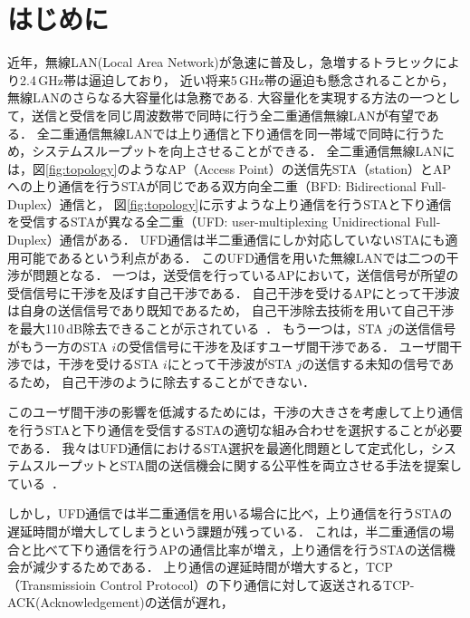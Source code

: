 \documentclass[technicalreport]{ieicej}
\begin{document}

\maketitle

\section{はじめに}
	近年，無線LAN(Local Area Network)が急速に普及し，急増するトラヒックにより2.4\,GHz帯は逼迫しており，
	近い将来5\,GHz帯の逼迫も懸念されることから，無線LANのさらなる大容量化は急務である.
	大容量化を実現する方法の一つとして，送信と受信を同じ周波数帯で同時に行う全二重通信無線LANが有望である．
	全二重通信無線LANでは上り通信と下り通信を同一帯域で同時に行うため，システムスループットを向上させることができる．
	全二重通信無線LANには，図\ref{fig:topology}のようなAP（Access Point）の送信先STA（station）とAPへの上り通信を行うSTAが同じである双方向全二重（BFD: Bidirectional Full-Duplex）通信と，
	図\ref{fig:topology}に示すような上り通信を行うSTAと下り通信を受信するSTAが異なる全二重（UFD: user-multiplexing Unidirectional Full-Duplex）通信がある．
	UFD通信は半二重通信にしか対応していないSTAにも適用可能であるという利点がある．
	このUFD通信を用いた無線LANでは二つの干渉が問題となる．
	一つは，送受信を行っているAPにおいて，送信信号が所望の受信信号に干渉を及ぼす自己干渉である．
	自己干渉を受けるAPにとって干渉波は自身の送信信号であり既知であるため，
	自己干渉除去技術を用いて自己干渉を最大110\,dB除去できることが示されている~\cite{fdmac, stanford1}．
	もう一つは，STA $j$の送信信号がもう一方のSTA $i$の受信信号に干渉を及ぼすユーザ間干渉である．
	ユーザ間干渉では，干渉を受けるSTA $i$にとって干渉波がSTA $j$の送信する未知の信号であるため，
	自己干渉のように除去することができない．
	\par
	このユーザ間干渉の影響を低減するためには，干渉の大きさを考慮して上り通信を行うSTAと下り通信を受信するSTAの適切な組み合わせを選択することが必要である．
	我々はUFD通信におけるSTA選択を最適化問題として定式化し，システムスループットとSTA間の送信機会に関する公平性を両立させる手法を提案している~\cite{promac_fair}．
	\par
	しかし，UFD通信では半二重通信を用いる場合に比べ，上り通信を行うSTAの遅延時間が増大してしまうという課題が残っている．
	これは，半二重通信の場合と比べて下り通信を行うAPの通信比率が増え，上り通信を行うSTAの送信機会が減少するためである．
	上り通信の遅延時間が増大すると，TCP（Transmissioin Control Protocol）の下り通信に対して返送されるTCP-ACK(Acknowledgement)の送信が遅れ，
\end{document}
